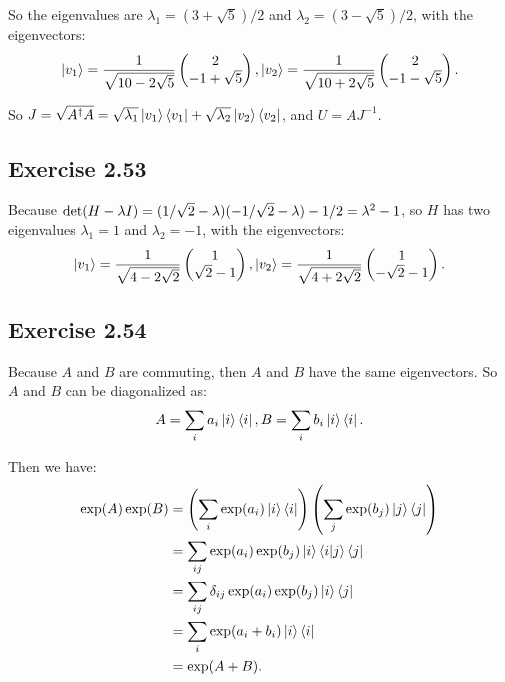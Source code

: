 So the eigenvalues are $\lambda_1=(3+\sqrt{5})/2$ and $\lambda_2=(3-\sqrt{5})/2$, with the eigenvectors:
\begin{align}
\ket{v_1}=\frac{1}{\sqrt{10-2\sqrt 5}}\begin{pmatrix}2\\-1+\sqrt 5\end{pmatrix},
\ket{v_2}=\frac{1}{\sqrt{10+2\sqrt 5}}\begin{pmatrix}2\\-1-\sqrt 5\end{pmatrix}.
\end{align}

So $J=\sqrt{A^\dagger A}=\sqrt{\lambda_1}\ket{v_1}\bra{v_1}+\sqrt{\lambda_2}\ket{v_2}\bra{v_2}$, and $U=AJ^{-1}$.

\subsection*{Exercise 2.53}

Because ${\rm det}(H-\lambda I)=(1/\sqrt 2-\lambda)(-1/\sqrt 2-\lambda)-1/ 2=\lambda^2-1$, so $H$ has two eigenvalues $\lambda_1 = 1$ and $\lambda_2 = -1$, with the eigenvectors:
\begin{align}
\ket{v_1}=\frac{1}{\sqrt{4-2\sqrt 2}}
\begin{pmatrix} 1\\ \sqrt 2 -1 \end{pmatrix},\ket{v_2}=\frac{1}{\sqrt{4+2\sqrt 2}}
\begin{pmatrix} 1\\ -\sqrt 2 -1 \end{pmatrix}.
\end{align}

\subsection*{Exercise 2.54}

Because $A$ and $B$ are commuting, then $A$ and $B$ have the same eigenvectors. So $A$ and $B$ can be diagonalized as:
\begin{align}
A=\sum_i a_i\ket{i}\bra{i},B=\sum_i b_i\ket{i}\bra{i}.
\end{align}

Then we have:
\begin{align}
\exp(A)\exp(B)&=\left(\sum_i \exp(a_i)\ket{i}\bra{i}\right)\left(\sum_j \exp(b_j)\ket{j}\bra{j}\right)\\
&=\sum_{ij}\exp(a_i)\exp(b_j)\ket{i}\bra{i}\ket{j}\bra{j}\\
&=\sum_{ij}\delta_{ij}\exp(a_i)\exp(b_j)\ket{i}\bra{j}\\
&=\sum_{i}\exp(a_i+b_i)\ket{i}\bra{i}\\
&=\exp(A+B).
\end{align}

